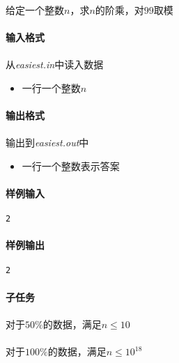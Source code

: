 \documentclass[UTF8]{ctexart}
\begin{document}
\paragraph{}给定一个整数$n$，求$n$的阶乘，对$99$取模
\paragraph{输入格式}
\paragraph{}从\emph{easiest.in}中读入数据
\begin{itemize}
\item 一行一个整数$n$
\end{itemize}
\paragraph{输出格式}
\paragraph{}输出到\emph{easiest.out}中
\begin{itemize}
	\item 一行一个整数表示答案
\end{itemize}
\paragraph{样例输入}
\begin{lstlisting}
2
\end{lstlisting}
\paragraph{样例输出}
\begin{lstlisting}
2
\end{lstlisting}
\paragraph{子任务}
\paragraph{}对于$50\%$的数据，满足$n\le 10$
\paragraph{}对于$100\%$的数据，满足$n\le 10^{18}$

\clearpage
\end{document}
